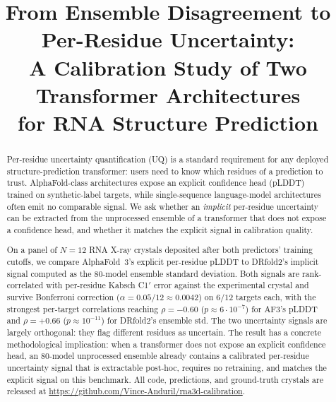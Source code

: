 \documentclass[conference,10pt]{IEEEtran}
\begin{document}
\title{From Ensemble Disagreement to Per-Residue Uncertainty:\\
A Calibration Study of Two Transformer Architectures\\
for RNA Structure Prediction}

\author{
}

\maketitle

\begin{abstract}
Per-residue uncertainty quantification (UQ) is a standard requirement
for any deployed structure-prediction transformer: users need to know
which residues of a prediction to trust. AlphaFold-class architectures
expose an explicit confidence head (pLDDT) trained on
synthetic-label targets, while single-sequence language-model
architectures often emit no comparable signal. We ask whether an
\emph{implicit} per-residue uncertainty can be extracted from the
unprocessed ensemble of a transformer that does not expose a
confidence head, and whether it matches the explicit signal in
calibration quality.

On a panel of $N = 12$ RNA X-ray crystals deposited after both
predictors' training cutoffs, we compare AlphaFold~3's explicit
per-residue pLDDT to DRfold2's implicit signal computed as the
$80$-model ensemble standard deviation. Both signals are rank-correlated
with per-residue Kabsch C1$'$ error against the experimental crystal
and survive Bonferroni correction ($\alpha = 0.05/12 \approx 0.0042$)
on $6/12$ targets each, with the strongest per-target correlations
reaching $\rho = -0.60$ ($p \approx 6 \cdot 10^{-7}$) for AF3's pLDDT
and $\rho = +0.66$ ($p \approx 10^{-11}$) for DRfold2's ensemble std.
The two uncertainty signals are largely orthogonal: they flag
different residues as uncertain. The result has a concrete
methodological implication: when a transformer does not expose an
explicit confidence head, an $80$-model unprocessed ensemble already
contains a calibrated per-residue uncertainty signal that is
extractable post-hoc, requires no retraining, and matches the
explicit signal on this benchmark.
All code, predictions, and ground-truth crystals are released at
\url{https://github.com/Vince-Anduril/rna3d-calibration}.
\end{abstract}
\end{document}
